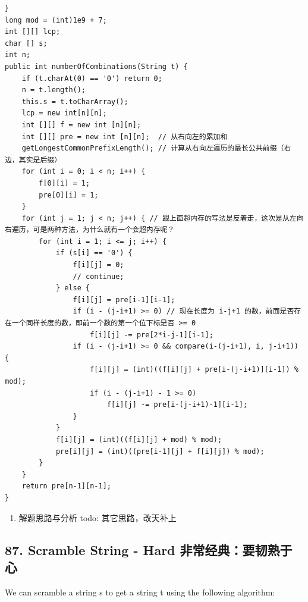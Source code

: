 \documentclass[9pt, b5paaper]{book}
\begin{document}
\begin{enumerate}
\begin{verbatim}
}
long mod = (int)1e9 + 7;
int [][] lcp;
char [] s; 
int n;
public int numberOfCombinations(String t) {
    if (t.charAt(0) == '0') return 0;
    n = t.length();
    this.s = t.toCharArray();
    lcp = new int[n][n];
    int [][] f = new int [n][n];
    int [][] pre = new int [n][n];  // 从右向左的累加和
    getLongestCommonPrefixLength(); // 计算从右向左遍历的最长公共前缀（右边，其实是后缀）
    for (int i = 0; i < n; i++) {
        f[0][i] = 1;
        pre[0][i] = 1;
    }
    for (int j = 1; j < n; j++) { // 跟上面超内存的写法是反着走，这次是从左向右遍历，可是两种方法，为什么就有一个会超内存呢？
        for (int i = 1; i <= j; i++) {
            if (s[i] == '0') {
                f[i][j] = 0;
                // continue;
            } else {
                f[i][j] = pre[i-1][i-1];
                if (i - (j-i+1) >= 0) // 现在长度为 i-j+1 的数，前面是否存在一个同样长度的数，即前一个数的第一个位下标是否 >= 0
                    f[i][j] -= pre[2*i-j-1][i-1];
                if (i - (j-i+1) >= 0 && compare(i-(j-i+1), i, j-i+1)) {
                    f[i][j] = (int)((f[i][j] + pre[i-(j-i+1)][i-1]) % mod);
                    if (i - (j-i+1) - 1 >= 0)
                        f[i][j] -= pre[i-(j-i+1)-1][i-1];
                }
            }
            f[i][j] = (int)((f[i][j] + mod) % mod);
            pre[i][j] = (int)((pre[i-1][j] + f[i][j]) % mod);
        }
    }
    return pre[n-1][n-1];
}
\end{verbatim}
\begin{enumerate}
\item 解题思路与分析 todo: 其它思路，改天补上
\label{sec-1-0-1-1-1}
\end{enumerate}
\end{enumerate}

\subsection{87. Scramble String - Hard 非常经典：要韧熟于心}
\label{sec-1-0-2}
We can scramble a string s to get a string t using the following algorithm:
\end{document}
